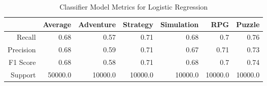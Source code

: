 \begin{table}[h]
    \centering
    \begin{tabular}{r|r|r|r|r|r|r}
        & Average & Adventure & Strategy & Simulation & RPG & Puzzle \\\hline
        Recall      & 0.68 & 0.57 & 0.71 & 0.68 & 0.7 & 0.76\\
        Precision   & 0.68 & 0.59 & 0.71 & 0.67 & 0.71 & 0.73\\
        F1 Score    & 0.68 & 0.58 & 0.71 & 0.68 & 0.7 & 0.74\\
        Support     & 50000.0 & 10000.0 & 10000.0 & 10000.0 & 10000.0 & 10000.0
\end{tabular}
    \caption{Classifier Model Metrics for Logistic Regression}
    \label{tab:model_metrics_logistic_regression}
\end{table}